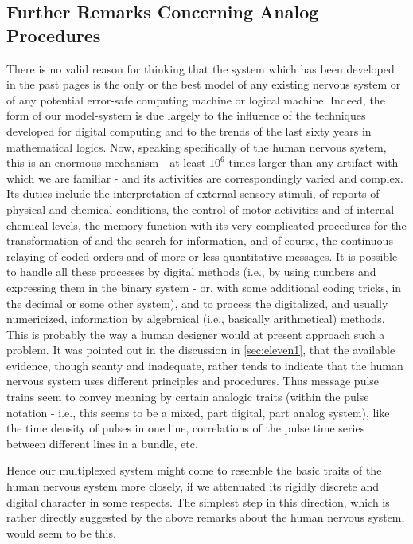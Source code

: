 \documentclass[twocolumn,preprintnumbers,amsmath,amssymb,floatfix]{revtex4}
\begin{document}
\subsection{\label{sec:twelve1}Further Remarks Concerning Analog Procedures}

There is no valid reason for thinking that the system which has
been developed in the past pages is the only or the best model of
any existing nervous system or of any potential error-safe
computing machine or logical machine. Indeed, the form of our
model-system is due largely to the influence of the techniques
developed for digital computing and to the trends of the last
sixty years in mathematical logics. Now, speaking specifically of
the human nervous system, this is an enormous mechanism - at least
$10^{6}$ times larger than any artifact with which we are familiar
- and its activities are correspondingly varied and complex. Its
duties include the interpretation of external sensory stimuli, of
reports of physical and chemical conditions, the control of motor
activities and of internal chemical levels, the memory function
with its very complicated procedures for the transformation of and
the search for information, and of course, the continuous relaying
of coded orders and of more or less quantitative messages. It is
possible to handle all these processes by digital methods (i.e.,
by using numbers and expressing them in the binary system - or,
with some additional coding tricks, in the decimal or some other
system), and to process the digitalized, and usually numericized,
information by algebraical (i.e., basically arithmetical) methods.
This is probably the way a human designer would at present
approach such a problem. It was pointed out in the discussion in
\ref{sec:eleven1}, that the available evidence, though scanty and
inadequate, rather tends to indicate that the human nervous system
uses different principles and procedures. Thus message pulse
trains seem to convey meaning by certain analogic traits (within
the pulse notation - i.e., this seems to be a mixed, part digital,
part analog system), like the time density of pulses in one line,
correlations of the pulse time series between different lines in a
bundle, etc.

Hence our multiplexed system might come to resemble the basic
traits of the human nervous system more closely, if we attenuated
its rigidly discrete and digital character in some respects. The
simplest step in this direction, which is rather directly
suggested by the above remarks about the human nervous system,
would seem to be this.
\end{document}
